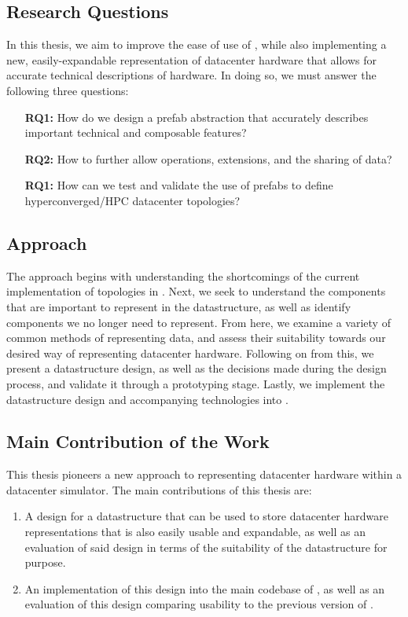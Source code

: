 \documentclass[11pt]{article}
\begin{document}
	\subsection{Research Questions}
		In this thesis, we aim to improve the ease of use of \opendc{}, while also implementing a new, easily-expandable representation of datacenter hardware that allows for accurate technical descriptions of hardware. 
		In doing so, we must answer the following three questions:
		\begin{itemize}
			\item [\textbf{RQ1:}] How do we design a prefab abstraction that accurately describes important technical and composable features?
			\item [\textbf{RQ2:}] How to further allow operations, extensions, and the sharing of data?
			\item [\textbf{RQ1:}] How can we test and validate the use of prefabs to define hyperconverged/HPC datacenter topologies?
		\end{itemize}
	
	\subsection{Approach}
		The approach begins with understanding the shortcomings of the current implementation of topologies in \opendc{}.
		Next, we seek to understand the components that are important to represent in the datastructure, as well as identify components we no longer need to represent.
		From here, we examine a variety of common methods of representing data, and assess their suitability towards our desired way of representing datacenter hardware.
		Following on from this, we present a datastructure design, as well as the decisions made during the design process, and validate it through a prototyping stage.
		Lastly, we implement the datastructure design and accompanying technologies into \opendc{}.
	
	\subsection{Main Contribution of the Work}
		This thesis pioneers a new approach to representing datacenter hardware within a datacenter simulator.
		The main contributions of this thesis are:
		\begin{enumerate}
			\item A design for a datastructure that can be used to store datacenter hardware representations that is also easily usable and expandable, as well as an evaluation of said design in terms of the suitability of the datastructure for purpose.
			\item An implementation of this design into the main codebase of \opendc{}, as well as an evaluation of this design comparing usability to the previous version of \opendc{}.
		\end{enumerate}
	
\end{document}
